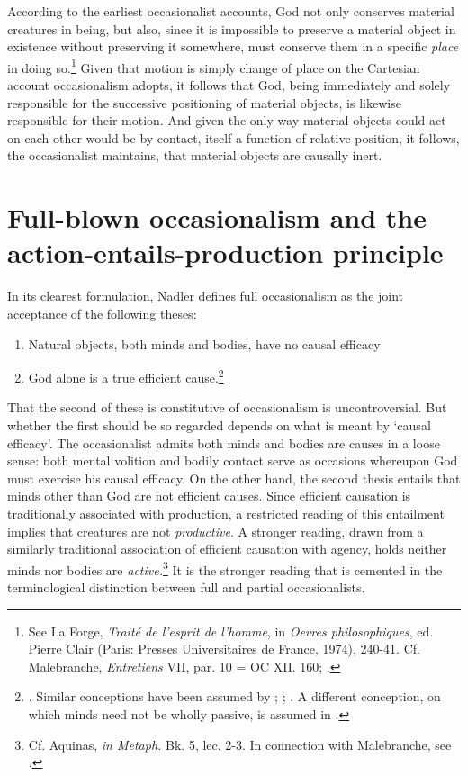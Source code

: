 According to the earliest occasionalist accounts, God not only conserves material creatures in being, but also, since it is impossible to preserve a material object in existence without preserving it somewhere, must conserve them in a specific \emph{place} in doing so.\footnote{See La Forge, \emph{Traité de l'esprit de l'homme}, in \emph{Oevres philosophiques}, ed. Pierre Clair (Paris: Presses Universitaires de France, 1974), 240-41. Cf. Malebranche, \emph{Entretiens} VII, par. 10 = OC XII. 160; \autocite{Nadler1998}.} Given that motion is simply change of place on the Cartesian account occasionalism adopts, it follows that God, being immediately and solely responsible for the successive positioning of material objects, is likewise responsible for their motion. And given the only way material objects could act on each other would be by contact, itself a function of relative position, it follows, the occasionalist maintains, that material objects are causally inert.

\section{Full-blown occasionalism and the action-entails-production principle}
In its clearest formulation, Nadler defines full occasionalism as the joint acceptance of the following theses:

\begin{enumerate}
	\item Natural objects, both minds and bodies, have no causal efficacy
	\item God alone is a true efficient cause.\footnote{\autocite[39]{Nadler2005}. Similar conceptions have been assumed by \autocite[174]{Battail1973}; \autocite[45-46]{Pyle2003}; \autocite[288]{Winkler2011}. A different conception, on which minds need not be wholly passive, is assumed in \autocite[358]{Radner1993}.}
\end{enumerate}

That the second of these is constitutive of occasionalism is uncontroversial. But whether the first should be so regarded depends on what is meant by `causal efficacy'. The occasionalist admits both minds and bodies are causes in a loose sense: both mental volition and bodily contact serve as occasions whereupon God must exercise his causal efficacy. On the other hand, the second thesis entails that minds other than God are not efficient causes. Since efficient causation is traditionally associated with production, a restricted reading of this entailment implies that creatures are not \emph{productive}. A stronger reading, drawn from a similarly traditional association of efficient causation with agency, holds neither minds nor bodies are \emph{active.}\footnote{Cf. Aquinas, \emph{in Metaph.} Bk. 5, lec. 2-3. In connection with Malebranche, see \autocite[255-256]{Baker2005}.} It is the stronger reading that is cemented in the terminological distinction between full and partial occasionalists. 

